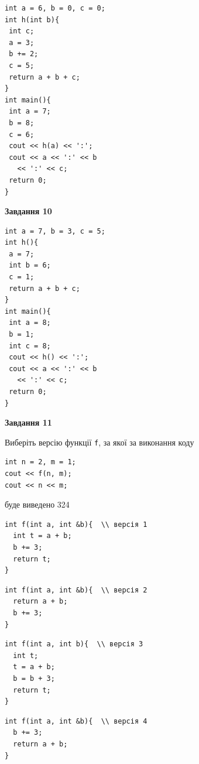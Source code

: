 \documentclass[12pt, ukrainian]{article}
\def\code#1{\Verb!#1!}
\begin{document}
{\begin {large}
\begin{minipage}[t]{7.0cm}
\begin{verbatim}
int a = 6, b = 0, c = 0;
int h(int b){
 int c;
 a = 3;
 b += 2;
 c = 5;
 return a + b + c;
}
int main(){
 int a = 7;
 b = 8;
 c = 6;
 cout << h(a) << ':';
 cout << a << ':' << b 
   << ':' << c;
 return 0;
}
\end{verbatim}



\begin{center}
\textbf{Завдання 10}
\end{center}
\vspace{-8mm}

\begin{verbatim}
int a = 7, b = 3, c = 5;
int h(){
 a = 7;
 int b = 6;
 c = 1;
 return a + b + c;
}
int main(){
 int a = 8;
 b = 1;
 int c = 8;
 cout << h() << ':';
 cout << a << ':' << b 
   << ':' << c;
 return 0;
}
\end{verbatim}

\end{minipage}
\vline \hspace{1mm}
\begin{minipage}[t]{11.0cm}

\begin{center}
\textbf{Завдання 11}
\end{center}
Виберіть версію функції \code{f}, за якої за виконання коду
\begin{verbatim}
int n = 2, m = 1;
cout << f(n, m);
cout << n << m;
\end{verbatim}

буде виведено 324

\begin{verbatim}
int f(int a, int &b){  \\ версія 1
  int t = a + b;
  b += 3;
  return t;
}
\end{verbatim}

\vspace{-8mm}\begin{verbatim}
int f(int a, int &b){  \\ версія 2
  return a + b;
  b += 3;
}
\end{verbatim}

\vspace{-8mm}\begin{verbatim}
int f(int a, int b){  \\ версія 3
  int t;
  t = a + b;
  b = b + 3;
  return t;
}
\end{verbatim}

\vspace{-8mm}\begin{verbatim}
int f(int a, int &b){  \\ версія 4
  b += 3;
  return a + b;
}
\end{verbatim}




\end{minipage}
\end{large}}
\end{document}
